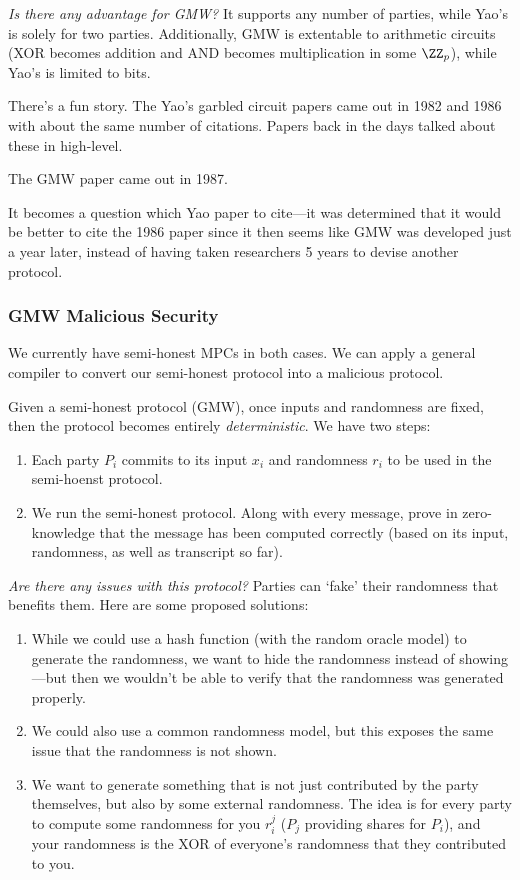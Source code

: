 \emph{Is there any advantage for GMW?} It supports any number of parties, while Yao's is solely for two parties. Additionally, GMW is extentable to arithmetic circuits (\textsf{XOR} becomes addition and \textsf{AND} becomes multiplication in some $\ZZ_p$), while Yao's is limited to bits.

\begin{remark*}
    There's a fun story. The Yao's garbled circuit papers came out in 1982 and 1986 with about the same number of citations. Papers back in the days talked about these in high-level.

    The GMW paper came out in 1987.

    It becomes a question which Yao paper to cite---it was determined that it would be better to cite the 1986 paper since it then seems like GMW was developed just a year later, instead of having taken researchers 5 years to devise another protocol.
\end{remark*}

\subsubsection{GMW Malicious Security}
We currently have semi-honest MPCs in both cases. We can apply a general compiler to convert our semi-honest protocol into a malicious protocol.

Given a semi-honest protocol (GMW), once inputs and randomness are fixed, then the protocol becomes entirely \emph{deterministic}. We have two steps:
\begin{enumerate}
    \item Each party $P_i$ commits to its input $x_i$ and randomness $r_i$ to be used in the semi-hoenst protocol.
    \item We run the semi-honest protocol. Along with every message, prove in zero-knowledge that the message has been computed correctly (based on its input, randomness, as well as transcript so far).
\end{enumerate}

\emph{Are there any issues with this protocol?} Parties can `fake' their randomness that benefits them. Here are some proposed solutions:
\begin{enumerate}
    \item While we could use a hash function (with the random oracle model) to generate the randomness, we want to hide the randomness instead of showing---but then we wouldn't be able to verify that the randomness was generated properly.
    \item We could also use a common randomness model, but this exposes the same issue that the randomness is not shown.
    \item We want to generate something that is not just contributed by the party themselves, but also by some external randomness. The idea is for every party to compute some randomness for you $r_i^j$ ($P_j$ providing shares for $P_i$), and your randomness is the \textsf{XOR} of everyone's randomness that they contributed to you.
\end{enumerate}

